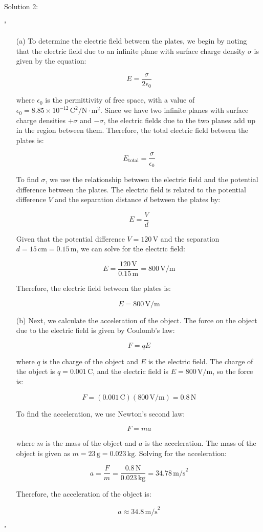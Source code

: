 Solution 2: 

"\begin{enumerate}
    \item[(a)] To determine the electric field between the plates, we begin by noting that the electric field due to an infinite plane with surface charge density $\sigma$ is given by the equation:

    \[
    E = \frac{\sigma}{2\epsilon_0}
    \]
    
    where $\epsilon_0$ is the permittivity of free space, with a value of $\epsilon_0 = 8.85 \times 10^{-12} \, \text{C}^2/\text{N} \cdot \text{m}^2$. Since we have two infinite planes with surface charge densities $+\sigma$ and $-\sigma$, the electric fields due to the two planes add up in the region between them. Therefore, the total electric field between the plates is:

    \[
    E_{\text{total}} = \frac{\sigma}{\epsilon_0}
    \]

    To find $\sigma$, we use the relationship between the electric field and the potential difference between the plates. The electric field is related to the potential difference $V$ and the separation distance $d$ between the plates by:

    \[
    E = \frac{V}{d}
    \]

    Given that the potential difference $V = 120 \, \text{V}$ and the separation $d = 15 \, \text{cm} = 0.15 \, \text{m}$, we can solve for the electric field:

    \[
    E = \frac{120 \, \text{V}}{0.15 \, \text{m}} = 800 \, \text{V/m}
    \]

    Therefore, the electric field between the plates is:

    \[
    E = 800 \, \text{V/m}
    \]

    \item[(b)] Next, we calculate the acceleration of the object. The force on the object due to the electric field is given by Coulomb’s law:

    \[
    F = qE
    \]

    where $q$ is the charge of the object and $E$ is the electric field. The charge of the object is $q = 0.001 \, \text{C}$, and the electric field is $E = 800 \, \text{V/m}$, so the force is:

    \[
    F = (0.001 \, \text{C})(800 \, \text{V/m}) = 0.8 \, \text{N}
    \]

    To find the acceleration, we use Newton’s second law:

    \[
    F = ma
    \]

    where $m$ is the mass of the object and $a$ is the acceleration. The mass of the object is given as $m = 23 \, \text{g} = 0.023 \, \text{kg}$. Solving for the acceleration:

    \[
    a = \frac{F}{m} = \frac{0.8 \, \text{N}}{0.023 \, \text{kg}} = 34.78 \, \text{m/s}^2
    \]

    Therefore, the acceleration of the object is:

    \[
    a \approx 34.8 \, \text{m/s}^2
    \]
\end{enumerate}"

